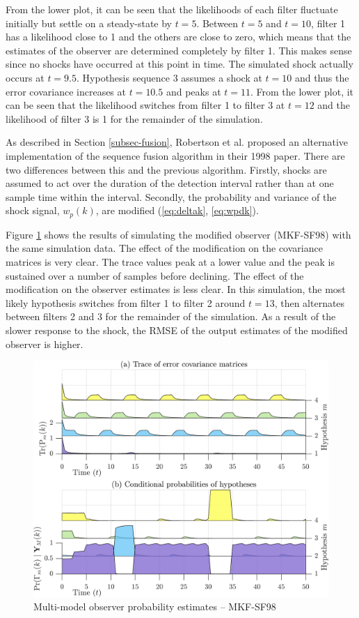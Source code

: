 From the lower plot, it can be seen that the likelihoods of each filter fluctuate initially but settle on a steady-state by $t=5$. Between $t=5$ and $t=10$, filter 1 has a likelihood close to 1 and the others are close to zero, which means that the estimates of the observer are determined completely by filter 1. This makes sense since no shocks have occurred at this point in time. The simulated shock actually occurs at $t=9.5$. Hypothesis sequence 3 assumes a shock at $t=10$ and thus the error covariance increases at $t=10.5$ and peaks at $t=11$. From the lower plot, it can be seen that the likelihood switches from filter 1 to filter 3 at $t=12$ and the likelihood of filter 3 is 1 for the remainder of the simulation.

As described in Section \ref{subsec-fusion}, Robertson et al. proposed an alternative implementation of the sequence fusion algorithm in their 1998 paper. There are two differences between this and the previous algorithm. Firstly, shocks are assumed to act over the duration of the detection interval rather than at one sample time within the interval. Secondly, the probability and variance of the shock signal, $w_{p}(k)$, are modified (\ref{eq:deltak}, \ref{eq:wpdk}).

Figure \ref{fig:rod-obs-sim-test-probs-SF1} shows the results of simulating the modified observer (MKF-SF98) with the same simulation data. The effect of the modification on the covariance matrices is very clear. The trace values peak at a lower value and the peak is sustained over a number of samples before declining. The effect of the modification on the observer estimates is less clear. In this simulation, the most likely hypothesis switches from filter 1 to filter 2 around $t=13$, then alternates between filters 2 and 3 for the remainder of the simulation. As a result of the slower response to the shock, the RMSE of the output estimates of the modified observer is higher.

\begin{figure}[htp]
	\centering
	\includegraphics[width=14cm]{images/rod_MKF_test_sim_MKF_SF98_prob.png}
	\caption{Multi-model observer probability estimates – MKF-SF98}
	\label{fig:rod-obs-sim-test-probs-SF1}
\end{figure}

